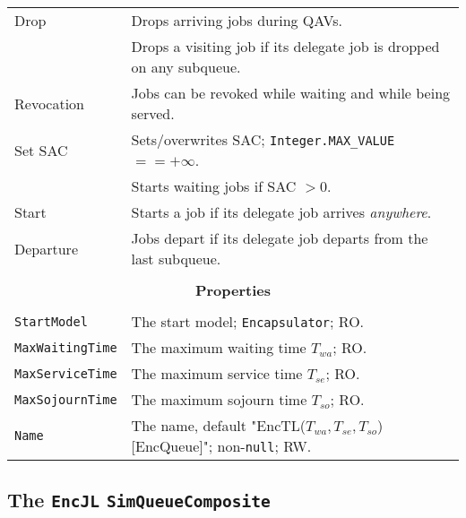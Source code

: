 \begin{tabular}{|l|l|}
	\hline
	Drop & Drops arriving jobs during QAVs. \\
	& Drops a visiting job if its delegate job is dropped on any subqueue. \\
	\hline
	Revocation & Jobs can be revoked while waiting and while being served. \\
	\hline
	Set SAC & Sets/overwrites SAC; \lstinline|Integer.MAX_VALUE| $== +\infty$. \\
	& Starts waiting jobs if SAC $> 0$. \\
	\hline
	Start & Starts a job if its delegate job arrives {\em anywhere}. \\
	\hline
	Departure & Jobs depart if its delegate job departs from the last subqueue. \\
	\hline
	\multicolumn{2}{|c|}{} \\
	\multicolumn{2}{|c|}{\bf Properties} \\
	\multicolumn{2}{|c|}{} \\
	\hline
	\lstinline|StartModel|    & The start model; \lstinline|Encapsulator|; RO. \\
	\hline
	\lstinline|MaxWaitingTime| & The maximum waiting time $T_{wa}$; RO. \\
	\hline
	\lstinline|MaxServiceTime| & The maximum service time $T_{se}$; RO. \\
	\hline
	\lstinline|MaxSojournTime| & The maximum sojourn time $T_{so}$; RO. \\
	\hline
	\lstinline|Name|          & The name, default "EncTL($T_{wa},T_{se}, T_{so}$)[EncQueue]"; non-\lstinline|null|; RW. \\
	\hline
\end{tabular}

\subsection{The \lstinline{EncJL} \lstinline{SimQueueComposite}}
\label{sec:EncJL}

